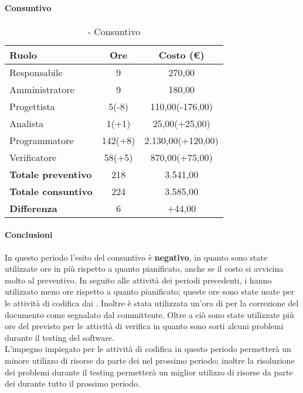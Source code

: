 \documentclass[./PianoDiProgetto.tex]{subfiles}
\begin{document}
\paragraph{Consuntivo}	
\begin{table}[H]
		\centering

		\begin{tabular}{l * {2}{c}}
			\toprule
			\textbf{Ruolo} & \textbf{Ore} & \textbf{Costo (\euro{})} \\
			\midrule
			Responsabile & 9    &  270,00 \\
			Amministratore  & 9    &  180,00 \\
			Progettista  & 5(-8)   &  110,00(-176,00) \\
			Analista & 1(+1)    &  25,00(+25,00) \\
			Programmatore  & 142(+8)    &  2.130,00(+120,00) \\
			Verificatore  & 58(+5)    &  870,00(+75,00) \\
			\midrule
			\textbf{Totale preventivo}  & 218   &  3.541,00 \\
			\textbf{Totale consuntivo}  & 224   &  3.585,00 \\
			\midrule
			\textbf{Differenza}  & 6  &  +44,00 \\
			\bottomrule
		\end{tabular}
		\caption{\PerC{} - Consuntivo}
	\end{table}
	\paragraph{Conclusioni}
	In questo periodo l'esito del consuntivo è \textbf{negativo}, in quanto sono state utilizzate ore in più rispetto a quanto pianificato, anche se il costo si avvicina molto al preventivo. In seguito alle attività dei periodi precedenti, i \PJP{} hanno utilizzato meno ore rispetto a quanto pianificato; queste ore sono state usate per le attività di codifica dai \PRP{}. Inoltre è stata utilizzata un'ora di \AN{} per la correzione del documento \ARdoc{} come segnalato dal committente. Oltre a ciò sono state utilizzate più ore del previsto per le attività di verifica in quanto sono sorti alcuni problemi durante il testing del software.\\
L'impegno impiegato per le attività di codifica in questo periodo permetterà un minore utilizzo  di risorse da parte dei \PRP{} nel prossimo periodo; inoltre la risoluzione dei problemi durante il testing permetterà un miglior utilizzo di risorse da parte dei \VERP{} durante tutto il prossimo periodo.
\end{document}
